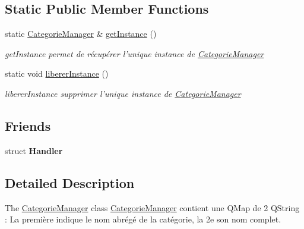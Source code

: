 \subsection*{Static Public Member Functions}
\begin{DoxyCompactItemize}
\item 
static \hyperlink{class_categorie_manager}{Categorie\+Manager} \& \hyperlink{class_categorie_manager_ac27223b725ffade86c87d84a4ffddba9}{get\+Instance} ()
\begin{DoxyCompactList}\small\item\em get\+Instance permet de récupérer l'unique instance de \hyperlink{class_categorie_manager}{Categorie\+Manager} \end{DoxyCompactList}\item 
\hypertarget{class_categorie_manager_a90c87f91898c7459a544cda26daad266}{static void \hyperlink{class_categorie_manager_a90c87f91898c7459a544cda26daad266}{liberer\+Instance} ()}\label{class_categorie_manager_a90c87f91898c7459a544cda26daad266}

\begin{DoxyCompactList}\small\item\em liberer\+Instance supprimer l'unique instance de \hyperlink{class_categorie_manager}{Categorie\+Manager} \end{DoxyCompactList}\end{DoxyCompactItemize}
\subsection*{Friends}
\begin{DoxyCompactItemize}
\item 
\hypertarget{class_categorie_manager_a7ab9a1e3d1a8ab9a8badf544bf7e0197}{struct {\bfseries Handler}}\label{class_categorie_manager_a7ab9a1e3d1a8ab9a8badf544bf7e0197}

\end{DoxyCompactItemize}


\subsection{Detailed Description}
The \hyperlink{class_categorie_manager}{Categorie\+Manager} class \hyperlink{class_categorie_manager}{Categorie\+Manager} contient une Q\+Map de 2 Q\+String \+: La première indique le nom abrégé de la catégorie, la 2e son nom complet. 

